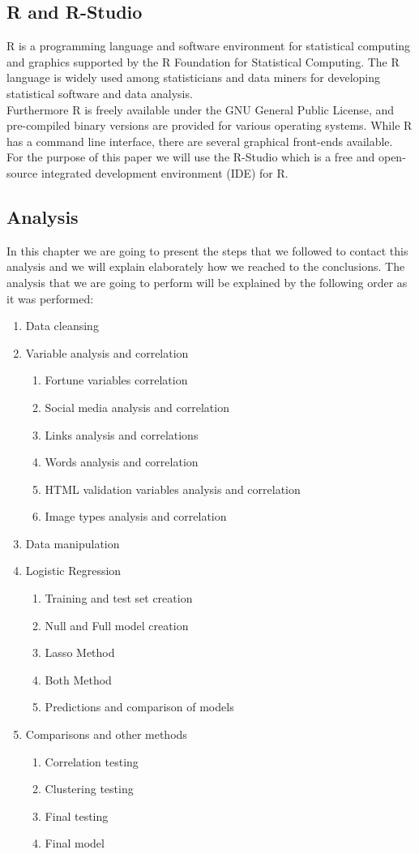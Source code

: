 \documentclass{article}
\begin{document}
\subsection{R and R-Studio}
R is a programming language and software environment for statistical computing and graphics supported by the R Foundation for Statistical Computing. The R language is widely used among statisticians and data miners for developing statistical software and data analysis.\\ 
Furthermore R is freely available under the GNU General Public License, and pre-compiled binary versions are provided for various operating systems. While R has a command line interface, there are several graphical front-ends available.\\
For the purpose of this paper we will use the R-Studio which  is a free and open-source integrated development environment (IDE) for R.
\subsection{Analysis}
In this chapter we are going to present the steps that we followed to contact this analysis and we will explain elaborately how we reached to the conclusions. The analysis that we are going to perform will be explained by the following order as it was performed:
\begin{enumerate}
\item Data cleansing
\item Variable analysis and correlation
\begin{enumerate}
\item Fortune variables correlation
\item Social media analysis and correlation
\item Links analysis and correlations
\item Words analysis and correlation
\item HTML validation variables analysis and correlation
\item Image types analysis and correlation
\end{enumerate}
\item Data manipulation
\item Logistic Regression
\begin{enumerate}
\item Training and test set creation
\item Null and Full model creation
\item Lasso Method
\item Both Method
\item Predictions and comparison of models
\end{enumerate}
\item Comparisons and other methods
\begin{enumerate}
\item Correlation testing
\item Clustering testing
\item Final testing
\item Final model
\end{enumerate}
\end{enumerate}
\end{document}
